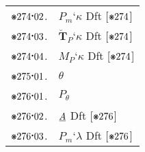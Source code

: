 \documentclass[12pt,openany,leqno,twocolumn]{book}
\newcommand{\pmast}{\text{\resizebox{!}{.75\height}{\ding{107}}}} %
\newcommand{\pmcdot}{\text{\raisebox{.05cm}{$\boldsymbol\cdot$}}} %
\newcommand{\pmbreve}[1]{\boldsymbol{\breve{#1}}}
\newcommand{\pma}{\emph{A}} %
\newcommand{\pmsfclsm}[2]{#1_m\textbf{`}#2} %
\newcommand{\pmsfclsp}[2]{\pmbreve{#1}_P\textbf{`}{#2}} %
\newcommand{\pmsfclsmp}[1]{M_P\textbf{`}{#1}} %
\newcommand{\pmcser}{\theta} %
\newcommand{\pmcsercl}[1]{#1_\pmcser} %
\begin{document}
\begin{tabular}{l l}
	$\pmast274\pmcdot02$. & $\pmsfclsm{P}{\kappa}$ \hspace{3.4ex} Dft [\(\pmast274\)] \\
	$\pmast274\pmcdot03$. & $\pmsfclsp{T}{\kappa}$ \hspace{3.7ex} Dft [\(\pmast274\)] \\
	$\pmast274\pmcdot04$. & $\pmsfclsmp{\kappa}$ \hspace{3ex} Dft [\(\pmast274\)] \\
	$\pmast275\pmcdot01$. & $\pmcser$ \\
	$\pmast276\pmcdot01$. & $\pmcsercl{P}$ \\
	$\pmast276\pmcdot02$. & $\pma$ \hspace{7.3ex} Dft [\(\pmast276\)] \\
	$\pmast276\pmcdot03$. & $\pmsfclsm{P}{\lambda}$ \hspace{4ex} Dft [\(\pmast276\)] 
\end{tabular}
\end{document}

